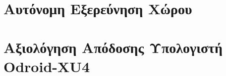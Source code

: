 \section{Αυτόνομη Εξερεύνηση Χώρου} \label{exploration_experiments}


\section{Αξιολόγηση Απόδοσης Υπολογιστή Odroid-XU4} \label{hardware_experiments}